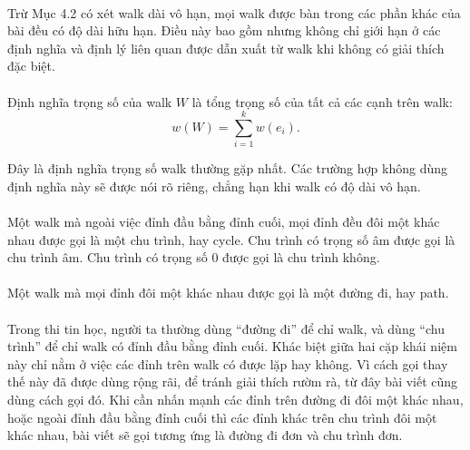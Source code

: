 \documentclass[11pt]{article}
\begin{document}
\paragraph{}
Trừ Mục 4.2 có xét walk dài vô hạn, mọi walk được bàn trong các phần khác của
bài đều có độ dài hữu hạn. Điều này bao gồm nhưng không chỉ giới hạn ở các định
nghĩa và định lý liên quan được dẫn xuất từ walk khi không có giải thích đặc
biệt.

\paragraph{}
Định nghĩa trọng số của walk \(W\) là tổng trọng số của tất cả các cạnh trên
walk:
\[
  w(W)=\sum_{i=1}^{k}w(e_i).
\]

Đây là định nghĩa trọng số walk thường gặp nhất. Các trường hợp không dùng
định nghĩa này sẽ được nói rõ riêng, chẳng hạn khi walk có độ dài vô hạn.

\paragraph{}
Một walk mà ngoài việc đỉnh đầu bằng đỉnh cuối, mọi đỉnh đều đôi một khác nhau
được gọi là một chu trình, hay cycle. Chu trình có trọng số âm được gọi là chu
trình âm. Chu trình có trọng số \(0\) được gọi là chu trình không.

\paragraph{}
Một walk mà mọi đỉnh đôi một khác nhau được gọi là một đường đi, hay path.

\paragraph{}
Trong thi tin học, người ta thường dùng ``đường đi'' để chỉ walk, và dùng
``chu trình'' để chỉ walk có đỉnh đầu bằng đỉnh cuối. Khác biệt giữa hai cặp
khái niệm này chỉ nằm ở việc các đỉnh trên walk có được lặp hay không. Vì cách
gọi thay thế này đã được dùng rộng rãi, để tránh giải thích rườm rà, từ đây
bài viết cũng dùng cách gọi đó. Khi cần nhấn mạnh các đỉnh trên đường đi đôi
một khác nhau, hoặc ngoài đỉnh đầu bằng đỉnh cuối thì các đỉnh khác trên chu
trình đôi một khác nhau, bài viết sẽ gọi tương ứng là đường đi đơn và chu trình
đơn.
\end{document}
